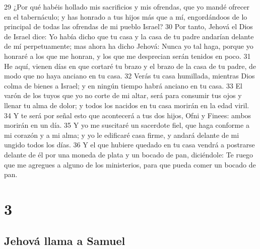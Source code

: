 29 ¿Por qué habéis hollado mis sacrificios y mis ofrendas, que yo mandé ofrecer en el tabernáculo; y has honrado a tus hijos más que a mí, engordándoos de lo principal de todas las ofrendas de mi pueblo Israel?
30 Por tanto, Jehová el Dios de Israel dice: Yo había dicho que tu casa y la casa de tu padre andarían delante de mí perpetuamente; mas ahora ha dicho Jehová: Nunca yo tal haga, porque yo honraré a los que me honran, y los que me desprecian serán tenidos en poco.
31 He aquí, vienen días en que cortaré tu brazo y el brazo de la casa de tu padre, de modo que no haya anciano en tu casa.
32 Verás tu casa humillada, mientras Dios colma de bienes a Israel; y en ningún tiempo habrá anciano en tu casa.
33 El varón de los tuyos que yo no corte de mi altar, será para consumir tus ojos y llenar tu alma de dolor; y todos los nacidos en tu casa morirán en la edad viril.
34 Y te será por señal esto que acontecerá a tus dos hijos, Ofni y Finees: ambos morirán en un día.
35 Y yo me suscitaré un sacerdote fiel, que haga conforme a mi corazón y a mi alma; y yo le edificaré casa firme, y andará delante de mi ungido todos los días.
36 Y el que hubiere quedado en tu casa vendrá a postrarse delante de él por una moneda de plata y un bocado de pan, diciéndole: Te ruego que me agregues a alguno de los ministerios, para que pueda comer un bocado de pan.

\chapter{3}

\section*{Jehová llama a Samuel}

